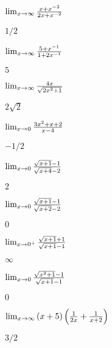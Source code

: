 \begin{exercises}
\begin{exercise} $\lim_{x\to\infty}{x+x^{-2}\over 2x+x^{-2}}$
\begin{answer} $1/2$
\end{answer}\end{exercise}

\begin{exercise} $\lim_{x\to\infty}{5+x^{-1}\over 1+2x^{-1}}$
\begin{answer} $5$
\end{answer}\end{exercise}

\begin{exercise} $\lim_{x\to\infty}{4x\over\sqrt{2x^2+1}}$
\begin{answer} $2\sqrt2$
\end{answer}\end{exercise}

\begin{exercise} $\lim_{x\to0}{3x^2+x+2\over x-4}$
\begin{answer} $-1/2$
\end{answer}\end{exercise}

\begin{exercise} $\lim_{x\to0}{\sqrt{x+1}-1\over \sqrt{x+4}-2}$
\begin{answer} $2$
\end{answer}\end{exercise}

\begin{exercise} $\lim_{x\to0}{\sqrt{x+1}-1\over \sqrt{x+2}-2}$
\begin{answer} $0$
\end{answer}\end{exercise}

\begin{exercise} $\lim_{x\to0^+}{\sqrt{x+1}+1\over\sqrt{x+1}-1}$
\begin{answer} $\infty$
\end{answer}\end{exercise}

\begin{exercise} $\lim_{x\to0}{\sqrt{x^2+1}-1\over\sqrt{x+1}-1}$
\begin{answer} $0$
\end{answer}\end{exercise}

\begin{exercise} $\lim_{x\to\infty}{(x+5)\left({1\over 2x}+{1\over x+2}\right)}$
\begin{answer} $3/2$
\end{answer}\end{exercise}


\end{exercises}
